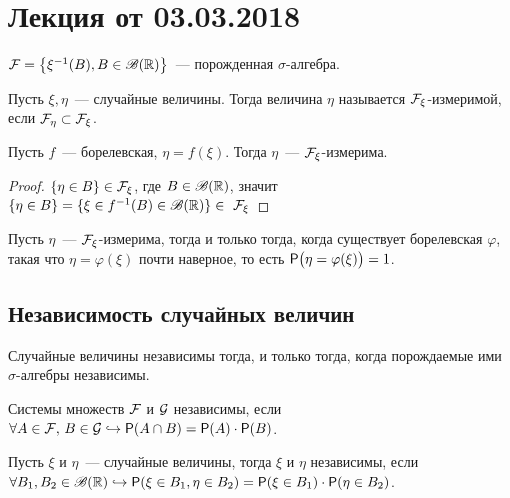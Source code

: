 \section{Лекция от 03.03.2018}
\setcounter{property}{0}
\begin{definition}
	$\F = \big\{ \xi^{-1}(B), B \in \B(\R) \big\}$~--- порожденная $\sigma$-алгебра.
\end{definition}

\begin{definition}
	Пусть $\xi, \eta$~--- случайные величины. Тогда величина $\eta$ называется $\F_\xi$-измеримой, если $\F_\eta \subset \F_\xi$.
\end{definition}

\begin{example}
	Пусть $f$~--- борелевская, $\eta = f(\xi)$. Тогда $\eta$~--- $\F_\xi$-измерима.
	\begin{proof}
		$\{\eta \in B\} \in \F_\xi$, где $B \in \B(\R)$, значит $\{\eta \in B\} = \{\xi \in f^{-1}(B) \in \B(\R)\} \in~\F_\xi$
	\end{proof}
\end{example}

\begin{theorem}[][Пока б/д]
	Пусть  $\eta$~--- $\F_\xi$-измерима, тогда и только тогда, когда существует борелевская $\varphi$, такая что $\eta = \varphi(\xi)$ почти наверное, то есть $\P\big(\eta = \varphi(\xi)\big) = 1$.
\end{theorem}

\subsection{Независимость случайных величин}
\begin{statement}
Случайные величины независимы тогда, и только тогда, когда порождаемые ими $\sigma$-алгебры независимы.
\end{statement}

\begin{definition}
	Системы множеств $\F$ и $\G$ независимы, если $\forall A \in \F,\, B \in \G \hookrightarrow \P(A \cap B) = \P(A)\cdot\P(B)$.
\end{definition}

\begin{definition}
	Пусть $\xi$ и $\eta$~--- случайные величины, тогда $\xi$ и $\eta$ независимы, если $\forall B_1, B_2 \in \B(\R) \hookrightarrow  \P(\xi \in B_1, \eta \in B_2) = \P(\xi \in B_1)\cdot\P(\eta \in B_2)$.
\end{definition}

